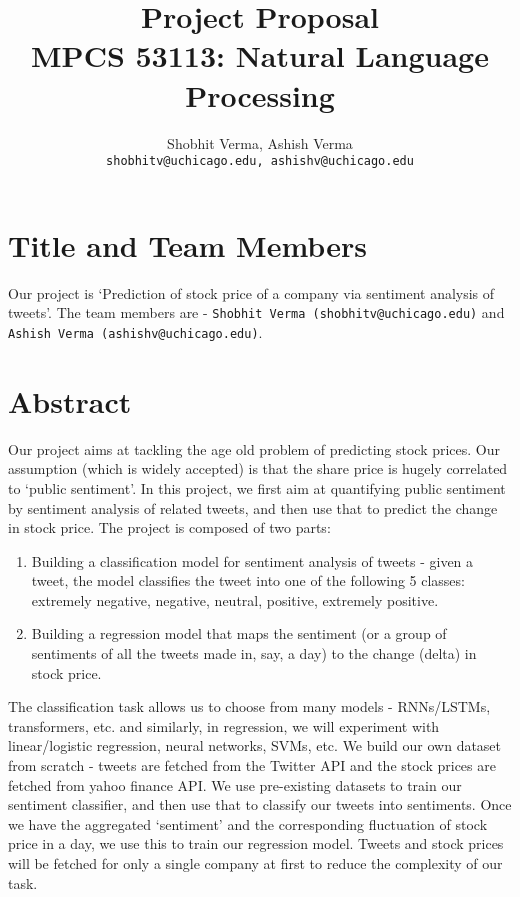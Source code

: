 \documentclass{article}
\title{Project Proposal\\MPCS 53113: Natural Language Processing}
\author{Shobhit Verma, Ashish Verma \\ \texttt{shobhitv@uchicago.edu, ashishv@uchicago.edu}}
\begin{document}
\maketitle

\section{Title and Team Members}
Our project is `Prediction of stock price of a company via sentiment analysis of tweets'. The team members are - \texttt{Shobhit Verma (shobhitv@uchicago.edu)} and \texttt{Ashish Verma (ashishv@uchicago.edu)}.

\section{Abstract}
    Our project aims at tackling the age old problem of predicting stock prices. Our assumption (which is widely accepted) is that the share price is hugely correlated to `public sentiment'. In this project, we first aim at quantifying public sentiment by sentiment analysis of related tweets, and then use that to predict the change in stock price. The project is composed of two parts:
    \begin{enumerate}
        \item Building a classification model for sentiment analysis of tweets - given a tweet, the model classifies the tweet into one of the following 5 classes: extremely negative, negative, neutral, positive, extremely positive.
        \item Building a regression model that maps the sentiment (or a group of sentiments of all the tweets made in, say, a day) to the change (delta) in stock price.
    \end{enumerate}
    The classification task allows us to choose from many models - RNNs/LSTMs, transformers, etc. and similarly, in regression, we will experiment with linear/logistic regression, neural networks, SVMs, etc. We build our own dataset from scratch - tweets are fetched from the Twitter API and the stock prices are fetched from yahoo finance API. We use pre-existing datasets to train our sentiment classifier, and then use that to classify our tweets into sentiments. Once we have the aggregated `sentiment' and the corresponding fluctuation of stock price in a day, we use this to train our regression model. Tweets and stock prices will be fetched for only a single company at first to reduce the complexity of our task.
\end{document}
